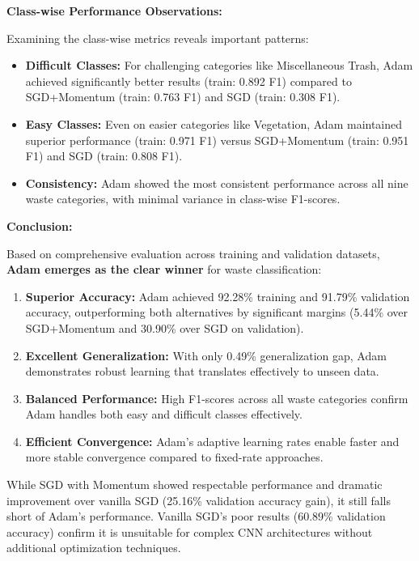 \documentclass[12pt,a4paper]{article}
\begin{document}
\textbf{Class-wise Performance Observations:}

Examining the class-wise metrics reveals important patterns:

\begin{itemize}
    \item \textbf{Difficult Classes:} For challenging categories like Miscellaneous Trash, Adam achieved significantly better results (train: 0.892 F1) compared to SGD+Momentum (train: 0.763 F1) and SGD (train: 0.308 F1).
    
    \item \textbf{Easy Classes:} Even on easier categories like Vegetation, Adam maintained superior performance (train: 0.971 F1) versus SGD+Momentum (train: 0.951 F1) and SGD (train: 0.808 F1).
    
    \item \textbf{Consistency:} Adam showed the most consistent performance across all nine waste categories, with minimal variance in class-wise F1-scores.
\end{itemize}

\textbf{Conclusion:}

Based on comprehensive evaluation across training and validation datasets, \textbf{Adam emerges as the clear winner} for waste classification:

\begin{enumerate}
    \item \textbf{Superior Accuracy:} Adam achieved 92.28\% training and 91.79\% validation accuracy, outperforming both alternatives by significant margins (5.44\% over SGD+Momentum and 30.90\% over SGD on validation).
    
    \item \textbf{Excellent Generalization:} With only 0.49\% generalization gap, Adam demonstrates robust learning that translates effectively to unseen data.
    
    \item \textbf{Balanced Performance:} High F1-scores across all waste categories confirm Adam handles both easy and difficult classes effectively.
    
    \item \textbf{Efficient Convergence:} Adam's adaptive learning rates enable faster and more stable convergence compared to fixed-rate approaches.
\end{enumerate}

While SGD with Momentum showed respectable performance and dramatic improvement over vanilla SGD (25.16\% validation accuracy gain), it still falls short of Adam's performance. Vanilla SGD's poor results (60.89\% validation accuracy) confirm it is unsuitable for complex CNN architectures without additional optimization techniques.
\end{document}
